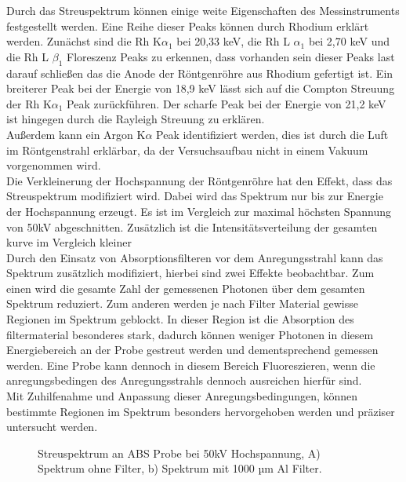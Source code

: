 Durch das Streuspektrum können einige weite Eigenschaften des Messinstruments festgestellt werden. Eine Reihe dieser Peaks können durch Rhodium erklärt werden. Zunächst sind die Rh K$\alpha_1 $ bei 20,33 keV, die Rh L $\alpha_1$ bei 2,70 keV und die Rh L $\beta_1$ Floreszenz Peaks zu erkennen, dass vorhanden sein dieser Peaks last darauf schließen das die Anode der Röntgenröhre aus Rhodium gefertigt ist. Ein breiterer Peak bei der Energie von 18,9 keV lässt sich auf die Compton Streuung der Rh K$\alpha_1 $ Peak zurückführen. Der scharfe Peak bei der Energie von 21,2 keV ist hingegen durch die Rayleigh Streuung zu erklären.\\
Außerdem kann ein Argon K$\alpha$ Peak identifiziert werden, dies ist durch die Luft im Röntgenstrahl erklärbar, da der Versuchsaufbau nicht in einem Vakuum vorgenommen wird.\\
Die Verkleinerung der Hochspannung der Röntgenröhre hat den Effekt, dass das Streuspektrum modifiziert wird. Dabei wird das Spektrum nur bis zur Energie der Hochspannung erzeugt. Es ist im Vergleich zur maximal höchsten Spannung von 50kV abgeschnitten. Zusätzlich ist die Intensitätsverteilung der gesamten kurve im Vergleich kleiner\\
Durch den Einsatz von Absorptionsfilteren vor dem Anregungsstrahl kann das Spektrum zusätzlich modifiziert, hierbei sind zwei Effekte beobachtbar.
Zum einen wird die gesamte Zahl der gemessenen Photonen über dem gesamten Spektrum reduziert. Zum anderen werden je nach Filter Material gewisse Regionen im Spektrum geblockt. In dieser Region ist die Absorption des filtermaterial besonderes stark, dadurch können weniger Photonen in diesem Energiebereich an der Probe gestreut werden und dementsprechend gemessen werden. Eine Probe kann dennoch in diesem Bereich Fluoreszieren, wenn die anregungsbedingen des Anregungsstrahls dennoch ausreichen hierfür sind.\\
Mit Zuhilfenahme und Anpassung dieser Anregungsbedingungen, können bestimmte Regionen im Spektrum besonders hervorgehoben werden und präziser untersucht werden.\\


\begin{figure}%
    \centering
    \qquad
    \caption{Streuspektrum an ABS Probe bei 50kV Hochspannung, A) Spektrum ohne Filter, b) Spektrum mit 1000 µm Al Filter.}%
    \label{fig:example}%
\end{figure}


